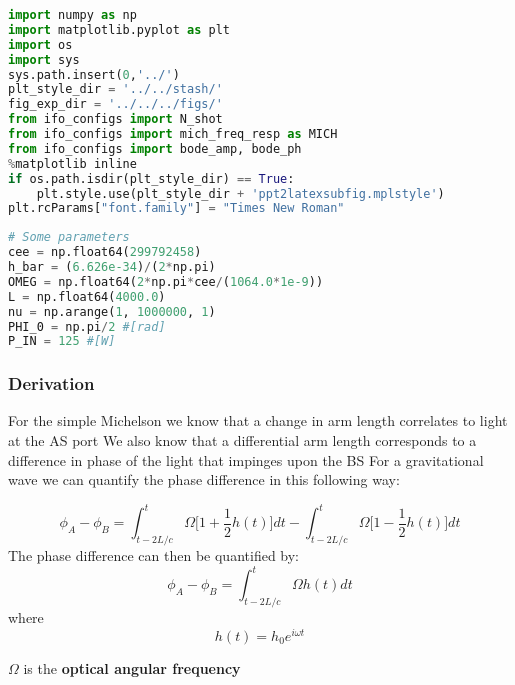 \begin{spacing}{1} \begin{lstlisting}[frame=single, language=Python]
import numpy as np
import matplotlib.pyplot as plt
import os
import sys
sys.path.insert(0,'../')
plt_style_dir = '../../stash/'
fig_exp_dir = '../../../figs/'
from ifo_configs import N_shot
from ifo_configs import mich_freq_resp as MICH
from ifo_configs import bode_amp, bode_ph
%matplotlib inline
if os.path.isdir(plt_style_dir) == True:
    plt.style.use(plt_style_dir + 'ppt2latexsubfig.mplstyle')
plt.rcParams["font.family"] = "Times New Roman"
\end{lstlisting} \end{spacing}

\begin{spacing}{1} \begin{lstlisting}[frame=single, language=Python]
# Some parameters
cee = np.float64(299792458)
h_bar = (6.626e-34)/(2*np.pi)
OMEG = np.float64(2*np.pi*cee/(1064.0*1e-9))
L = np.float64(4000.0)
nu = np.arange(1, 1000000, 1)
PHI_0 = np.pi/2 #[rad]
P_IN = 125 #[W]
\end{lstlisting} \end{spacing}

\hypertarget{derivation}{%
\subsubsection{Derivation}\label{derivation}}

For the simple Michelson we know that a change in arm length correlates
to light at the AS port We also know that a differential arm length
corresponds to a difference in phase of the light that impinges upon the
BS For a gravitational wave we can quantify the phase difference in this
following way:

\begin{equation}
\phi_A - \phi_B = \int_{t-2L/c}^{t} \Omega \bigg[1 + \frac{1}{2}h(t)\bigg]dt - \int_{t-2L/c}^{t} \Omega \bigg[1 - \frac{1}{2}h(t)\bigg]dt 
\end{equation} The phase difference can then be quantified by: \begin{equation}
\phi_A - \phi_B = \int_{t-2L/c}^{t} \Omega h(t)dt 
\end{equation} where \begin{equation} 
h(t) = h_0 e^{i \omega t} 
\end{equation}

\emph{\(\Omega\)} is the \textbf{optical angular frequency}

